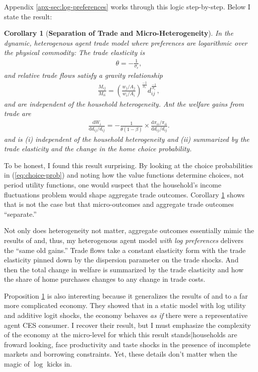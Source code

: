 \documentclass[12pt,pdftex]{article}
\newtheorem{corr}{Corollary}
\begin{document}
\begin{onehalfspacing}
Appendix \ref{apx-sec:log-preferences} works through this logic step-by-step. Below I state the result:
\begin{corr}[\textbf{Separation of Trade and Micro-Heterogeneity}]\label{prp:seperation} In the dynamic, heterogenous agent trade model where preferences are logarithmic over the physical commodity: The trade elasticity is
\begin{align}
\theta = -\frac{1}{\sigma_{\epsilon}}, \nonumber
\end{align}
and relative trade flows satisfy a gravity relationship
\begin{align}
\frac{M_{ij}}{M_{ii}} = \left( \frac{  w_{j} / A_{j} }{  w_{i} / A_{i} } \right)^{\frac{-1}{\sigma_{\epsilon}}} d_{ij}^{\frac{-1}{\sigma_{\epsilon}}}, \nonumber
\end{align}
and are independent of the household heterogeneity. Ant the welfare gains from trade are
\begin{align}
\frac{\mathrm{d} W_{i}}{\mathrm{d} d_{ij} / d_{ij}} = -\frac{1}{\theta (1-\beta)} \times \frac{\mathrm{d} \pi_{ii} / \pi_{ii}}{\mathrm{d}d_{ij} / d_{ij}}. \nonumber
\end{align}
and is (i) independent of the household heterogeneity and (ii) summarized by the trade elasticity and the change in the home choice probability.
\end{corr}
To be honest, I found this result surprising. By looking at the choice probabilities in (\ref{eq:choice-prob}) and noting how the value functions determine choices, not period utility functions, one would suspect that the household's income fluctuations problem would shape aggregate trade outcomes. Corollary \ref{prp:seperation} shows that is not the case but that micro-outcomes and aggregate trade outcomes ``separate.''

Not only does heterogeneity not matter, aggregate outcomes essentially mimic the results of \citet{arkolakis2012new} and, thus, my heterogenous agent model \emph{with log preferences} delivers the ``same old gains.'' Trade flows take a constant elasticity form with the trade elasticity pinned down by the dispersion parameter on the trade shocks. And then the total change in welfare is summarized by the trade elasticity and how the share of home purchases changes to any change in trade costs.

Proposition \ref{prp:seperation} is also interesting because it generalizes the results of \citet*{anderson1987ces} and \citet{anderson1992discrete} to a far more complicated economy. They showed that in a static model with log utility and additive logit shocks, the economy behaves \emph{as if} there were a representative agent CES consumer. I recover their result, but I must emphasize the complexity of the economy at the micro-level for which this result stands|households are froward looking, face productivity and taste shocks in the presence of incomplete markets and borrowing constraints. Yet, these details don't matter when the magic of $\log$ kicks in.


\end{onehalfspacing}
\end{document}
